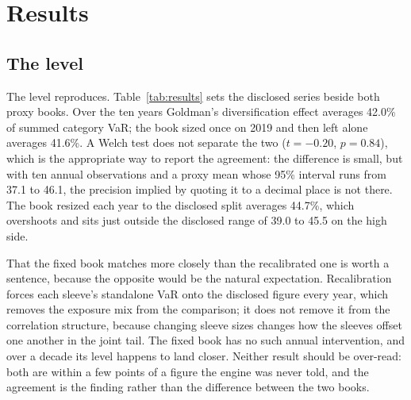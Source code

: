 %

\section{Results}\label{sec:results}

\subsection{The level}

The level reproduces. Table~\ref{tab:results} sets the disclosed series beside
both proxy books. Over the ten years Goldman's diversification effect averages
42.0\% of summed category VaR; the book sized once on 2019 and then left alone
averages 41.6\%. A Welch test does not separate the two ($t = -0.20$,
$p = 0.84$), which is the appropriate way to report the agreement: the
difference is small, but with ten annual observations and a proxy mean whose
95\% interval runs from 37.1 to 46.1, the precision implied by quoting it to a
decimal place is not there. The book resized each year to the disclosed split
averages 44.7\%, which overshoots and sits just outside the disclosed range of
39.0 to 45.5 on the high side.



That the fixed book matches more closely than the recalibrated one is worth a
sentence, because the opposite would be the natural expectation. Recalibration
forces each sleeve's standalone VaR onto the disclosed figure every year, which
removes the exposure mix from the comparison; it does not remove it from the
correlation structure, because changing sleeve sizes changes how the sleeves
offset one another in the joint tail. The fixed book has no such annual
intervention, and over a decade its level happens to land closer. Neither
result should be over-read: both are within a few points of a figure the
engine was never told, and the agreement is the finding rather than the
difference between the two books.

